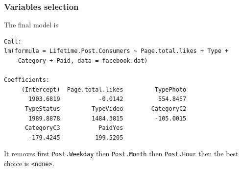 \begin{frame}[fragile]
\frametitle{Variables selection}
The final model is
\tiny
\begin{verbatim}
Call:
lm(formula = Lifetime.Post.Consumers ~ Page.total.likes + Type + 
    Category + Paid, data = facebook.dat)

Coefficients:
     (Intercept)  Page.total.likes         TypePhoto  
       1903.6819           -0.0142          554.8457  
      TypeStatus         TypeVideo        CategoryC2  
       1989.8878         1484.3815         -105.0015  
      CategoryC3           PaidYes  
       -179.4245          199.5205
\end{verbatim}
\normalsize
It removes first {\tt Post.Weekday} then {\tt Post.Month} then {\tt Post.Hour} then the best choice is {\tt <none>}.
\end{frame}


